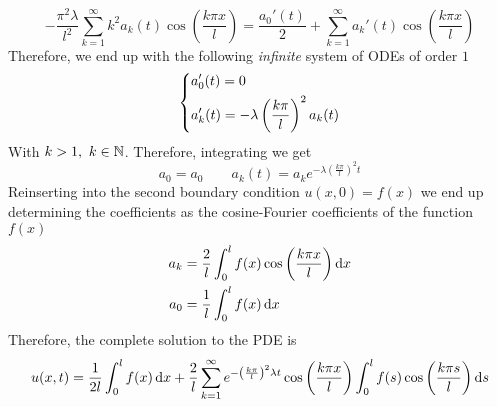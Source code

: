 \documentclass[../complete.tex]{subfiles}
\begin{document}
\begin{eg}
	\begin{equation*}
		-\frac{\pi^2\lambda}{l^2}\sum_{k=1}^{\infty}k^2a_k(t)\cos\left( \frac{k\pi x}{l} \right)=\frac{a_0'(t)}{2}+\sum_{k=1}^{\infty}a_k'(t)\cos\left( \frac{k\pi x}{l} \right)
	\end{equation*}
	Therefore, we end up with the following \emph{infinite} system of ODEs of order $1$
	\begin{equation*}
		\begin{dcases}
			a_0'(t)=0\\
			a_k'(t)=-\lambda\left( \frac{k\pi}{l} \right)^2a_k(t)
		\end{dcases}
	\end{equation*}
	With $k>1,\ k\in\N$. Therefore, integrating we get
	\begin{equation*}
		a_0=a_0\qquad a_k(t)=a_ke^{-\lambda\left( \frac{k\pi}{l} \right)^2t}
	\end{equation*}
	Reinserting into the second boundary condition $u(x,0)=f(x)$ we end up determining the coefficients as the cosine-Fourier coefficients of the function $f(x)$
	\begin{equation*}
		\begin{aligned}
			a_k&=\frac{2}{l}\int_{0}^{l}f(x)\cos\left( \frac{k\pi x}{l} \right)\operatorname{d\!} x\\
			a_0&=\frac{1}{l}\int_{0}^{l}f(x)\operatorname{d\!} x
		\end{aligned}
	\end{equation*}
	Therefore, the complete solution to the PDE is
	\begin{equation*}
		u(x,t)=\frac{1}{2l}\int_{0}^{l}f(x)\operatorname{d\!} x+\frac{2}{l}\sum_{k=1}^{\infty}e^{-\left( \frac{k\pi}{l} \right)^2\lambda t}\cos\left( \frac{k\pi x}{l} \right)\int_{0}^{l}f(s)\cos\left( \frac{k\pi s}{l} \right)\operatorname{d\!} s
	\end{equation*}
\end{eg}
\end{document}
